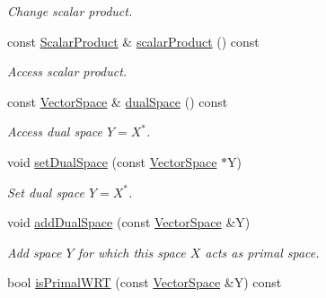\begin{DoxyCompactItemize}
\begin{DoxyCompactList}\small\item\em Change scalar product. \end{DoxyCompactList}\item 
\hypertarget{classSpacy_1_1VectorSpace_a6f63e2ef5afe7530cbc9480cbc37a8d7}{}const \hyperlink{namespaceSpacy_aa995526aa0e3fa58aca8dd6772311cad}{Scalar\+Product} \& \hyperlink{classSpacy_1_1VectorSpace_a6f63e2ef5afe7530cbc9480cbc37a8d7}{scalar\+Product} () const \label{classSpacy_1_1VectorSpace_a6f63e2ef5afe7530cbc9480cbc37a8d7}

\begin{DoxyCompactList}\small\item\em Access scalar product. \end{DoxyCompactList}\item 
\hypertarget{classSpacy_1_1VectorSpace_ac90bd2dd9c6dbcd0a295b2b7d9e2b9b2}{}const \hyperlink{classSpacy_1_1VectorSpace}{Vector\+Space} \& \hyperlink{classSpacy_1_1VectorSpace_ac90bd2dd9c6dbcd0a295b2b7d9e2b9b2}{dual\+Space} () const \label{classSpacy_1_1VectorSpace_ac90bd2dd9c6dbcd0a295b2b7d9e2b9b2}

\begin{DoxyCompactList}\small\item\em Access dual space $Y=X^*$. \end{DoxyCompactList}\item 
\hypertarget{classSpacy_1_1VectorSpace_a22d977f8e7239de59f9c5abffdaa6b3d}{}void \hyperlink{classSpacy_1_1VectorSpace_a22d977f8e7239de59f9c5abffdaa6b3d}{set\+Dual\+Space} (const \hyperlink{classSpacy_1_1VectorSpace}{Vector\+Space} $\ast$Y)\label{classSpacy_1_1VectorSpace_a22d977f8e7239de59f9c5abffdaa6b3d}

\begin{DoxyCompactList}\small\item\em Set dual space $Y=X^*$. \end{DoxyCompactList}\item 
void \hyperlink{classSpacy_1_1VectorSpace_a6477c132f76235270db33fa85b13acd9}{add\+Dual\+Space} (const \hyperlink{classSpacy_1_1VectorSpace}{Vector\+Space} \&Y)
\begin{DoxyCompactList}\small\item\em Add space $Y$ for which this space $X$ acts as primal space. \end{DoxyCompactList}\item 
\hypertarget{classSpacy_1_1VectorSpace_aae96ebd6f5e4a1a95ab8684b49062e7d}{}bool \hyperlink{classSpacy_1_1VectorSpace_aae96ebd6f5e4a1a95ab8684b49062e7d}{is\+Primal\+W\+R\+T} (const \hyperlink{classSpacy_1_1VectorSpace}{Vector\+Space} \&Y) const \label{classSpacy_1_1VectorSpace_aae96ebd6f5e4a1a95ab8684b49062e7d}


\end{DoxyCompactItemize}
